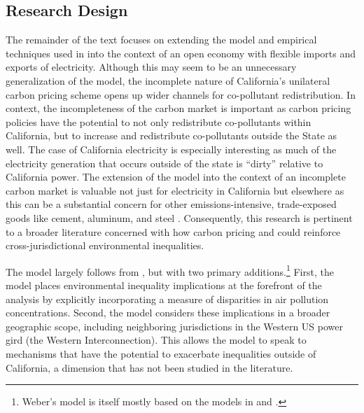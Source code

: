 

\subsection{Research Design}

The remainder of the text focuses on extending the model and empirical techniques used in \cite{weber2021dynamic} into the context of an open economy with flexible imports and exports of electricity. Although this may seem to be an unnecessary generalization of the model, the incomplete nature of California's unilateral carbon pricing scheme opens up wider channels for co-pollutant redistribution. In context, the incompleteness of the carbon market is important as carbon pricing policies have the potential to not only redistribute co-pollutants within California, but to increase and redistribute co-pollutants outside the State as well. The case of California electricity is especially interesting as much of the electricity generation that occurs outside of the state is ``dirty” relative to California power. 
The extension of the model into the context of an incomplete carbon market is valuable not just for electricity in California but elsewhere as this can be a substantial concern for other emissions-intensive, trade-exposed goods like cement, aluminum, and steel \citep{fowlie2022mitigating}. Consequently, this research is pertinent to a broader literature concerned with how carbon pricing and could reinforce cross-jurisdictional environmental inequalities. 

The model largely follows from \cite{weber2021dynamic}, but with two primary additions.\footnote{Weber's model is itself mostly based on the models in \cite{cullen2015} and \cite{cullen2017}.} First, the model places environmental inequality implications at the forefront of the analysis by explicitly incorporating a measure of disparities in air pollution concentrations. Second, the model considers these implications in a broader geographic scope, including neighboring jurisdictions in the Western US power gird (the Western Interconnection). This allows the model to speak to mechanisms that have the potential to exacerbate inequalities outside of California, a dimension that has not been studied in the literature.

